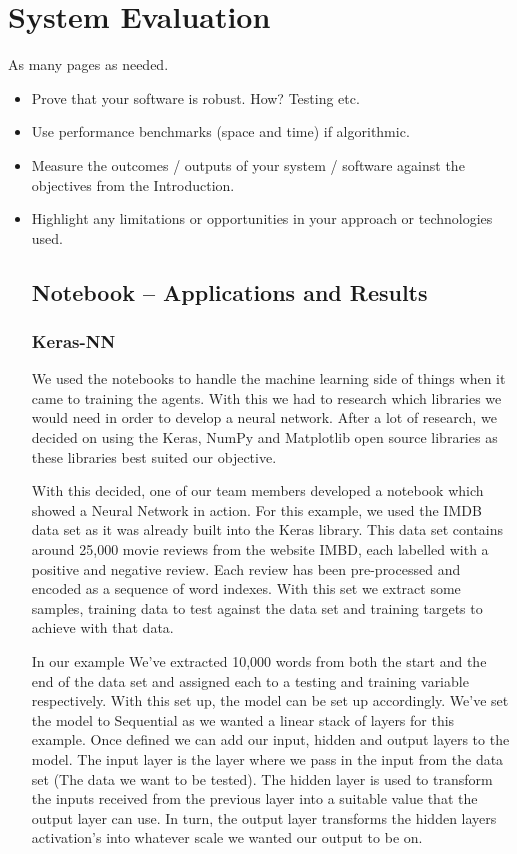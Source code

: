 
\chapter{System Evaluation}
As many pages as needed.
\begin{itemize}
\item Prove that your software is robust. How? Testing etc. 
\item Use performance benchmarks (space and time) if algorithmic.
\item Measure the outcomes / outputs of your system / software against the objectives from the Introduction.
\item Highlight any limitations or opportunities in your approach or technologies used.

\section{Notebook – Applications and Results}
\subsection{Keras-NN}
We used the notebooks to handle the machine learning side of things when it came to training the agents. 
With this we had to research which libraries we would need in order to develop a neural network. After a lot of research, we decided on using the Keras, NumPy and Matplotlib open source libraries as these libraries best suited our objective. 

With this decided, one of our team members developed a notebook which showed a Neural Network in action. For this example, we used the IMDB data set as it was already built into the Keras library. This data set contains around 25,000 movie reviews from the website IMBD, each labelled with a positive and negative review. Each review has been pre-processed and encoded as a sequence of word indexes. With this set we extract some samples, training data to test against the data set and training targets to achieve with that data. 

In our example We’ve extracted 10,000 words from both the start and the end of the data set and assigned each to a testing and training variable respectively. With this set up, the model can be set up accordingly. We’ve set the model to Sequential as we wanted a linear stack of layers for this example. Once defined we can add our input, hidden and output layers to the model. The input layer is the layer where we pass in the input from the data set (The data we want to be tested). The hidden layer is used to transform the inputs received from the previous layer into a suitable value that the output layer can use. In turn, the output layer transforms the hidden layers activation's into whatever scale we wanted our output to be on. 


\end{itemize}
